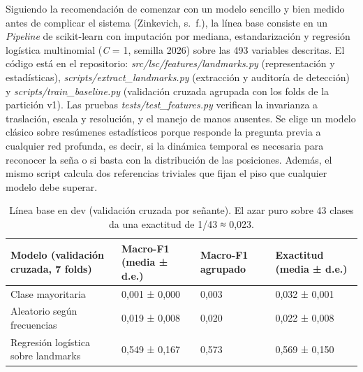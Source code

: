 \documentclass[11pt,a4paper]{article}
\newcommand{\code}[1]{\textit{#1}}
\begin{document}
Siguiendo la recomendación de comenzar con un modelo sencillo y bien medido antes de complicar el sistema (Zinkevich, s.~f.), la línea base consiste en un \code{Pipeline} de scikit-learn con imputación por mediana, estandarización y regresión logística multinomial (\emph{C} = 1, semilla 2026) sobre las 493 variables descritas. El código está en el repositorio: \code{src/lsc/features/landmarks.py} (representación y estadísticas), \code{scripts/extract\_landmarks.py} (extracción y auditoría de detección) y \code{scripts/train\_baseline.py} (validación cruzada agrupada con los folds de la partición v1). Las pruebas \code{tests/test\_features.py} verifican la invarianza a traslación, escala y resolución, y el manejo de manos ausentes. Se elige un modelo clásico sobre resúmenes estadísticos porque responde la pregunta previa a cualquier red profunda, es decir, si la dinámica temporal es necesaria para reconocer la seña o si basta con la distribución de las posiciones. Además, el mismo script calcula dos referencias triviales que fijan el piso que cualquier modelo debe superar.

\begin{table}[htbp]
\centering
\caption{Línea base en dev (validación cruzada por señante). El azar puro sobre 43 clases da una exactitud de 1/43 ≈ 0,023.}
\small
\renewcommand{\arraystretch}{1.22}
\begin{tabularx}{\textwidth}{@{}lYYY@{}}
\toprule
\textbf{Modelo (validación cruzada, 7 folds)} & \textbf{Macro-F1 (media ± d.e.)} & \textbf{Macro-F1 agrupado} & \textbf{Exactitud (media ± d.e.)}\\
\midrule
Clase mayoritaria & 0,001 ± 0,000 & 0,003 & 0,032 ± 0,001\\
Aleatorio según frecuencias & 0,019 ± 0,008 & 0,020 & 0,022 ± 0,008\\
Regresión logística sobre landmarks & 0,549 ± 0,167 & 0,573 & 0,569 ± 0,150\\
\bottomrule
\end{tabularx}
\end{table}
\end{document}
